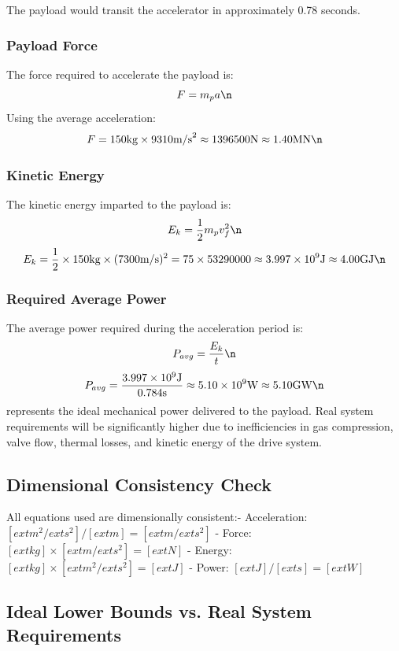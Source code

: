 \documentclass{article}
\begin{document}
The payload would transit the accelerator in approximately 0.78 seconds.\n\n\subsubsection{Payload Force}
The force required to accelerate the payload is:\n\begin{equation}
 F = m_p a\n\end{equation}
Using the average acceleration:\n\begin{equation}
 F = 150  \text{kg} \times 9310  \text{m/s}^2 \approx 1396500  \text{N} \approx 1.40  \text{MN}\n\end{equation}
\n\subsubsection{Kinetic Energy}
The kinetic energy imparted to the payload is:\n\begin{equation}
 E_k = \frac{1}{2} m_p v_f^2\n\end{equation}
\begin{equation}
 E_k = \frac{1}{2} \times 150  \text{kg} \times (7300  \text{m/s})^2 = 75 \times 53290000 \approx 3.997 \times 10^9  \text{J} \approx 4.00  \text{GJ}\n\end{equation}
\n\subsubsection{Required Average Power}
The average power required during the acceleration period is:\n\begin{equation}
 P_{avg} = \frac{E_k}{t}\n\end{equation}
\begin{equation}
 P_{avg} = \frac{3.997 \times 10^9  \text{J}}{0.784  \text{s}} \approx 5.10 \times 10^9  \text{W} \approx 5.10  \text{GW}\n\end{equation}
\nThis represents the ideal mechanical power delivered to the payload. Real system requirements will be significantly higher due to inefficiencies in gas compression, valve flow, thermal losses, and kinetic energy of the drive system.\n\n\subsection{Dimensional Consistency Check}
All equations used are dimensionally consistent:\n- Acceleration: $[	ext{m}^2/	ext{s}^2] / [	ext{m}] = [	ext{m}/	ext{s}^2]$ \checkmark\n- Force: $[	ext{kg}] \times [	ext{m}/	ext{s}^2] = [	ext{N}]$ \checkmark\n- Energy: $[	ext{kg}] \times [	ext{m}^2/	ext{s}^2] = [	ext{J}]$ \checkmark\n- Power: $[	ext{J}] / [	ext{s}] = [	ext{W}]$ \checkmark\n\n\subsection{Ideal Lower Bounds vs. Real System Requirements}
\end{document}
